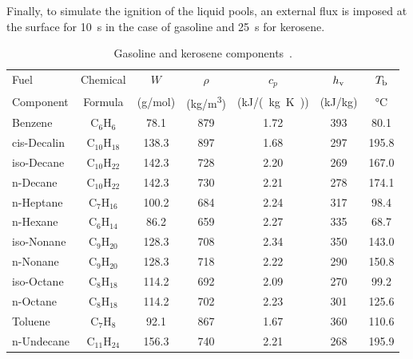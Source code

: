 Finally, to simulate the ignition of the liquid pools, an external flux is imposed at the surface for 10~s in the case of gasoline and 25~s for kerosene.

\begin{table}[h!]
\centering
\caption[Gasoline and kerosene components]{Gasoline and kerosene components~\cite{CRCHandbook:Enthalpy_of_Vaporization}.}
\label{fuelprops2}
\begin{tabular}{|l|c|c|c|c|c|c|} \hline
Fuel        & Chemical          & $W$         & $\rho$      & $c_p$              & $h_{\rm v}$        & $T_{\rm b}$     \\
Component   & Formula           & (g/mol)     & (\unit{kg/m^3})  & (\unit{kJ/(kg.K)})  & (kJ/kg)            & \unit{\degreeCelsius}       \\
\hline \hline
Benzene     & C$_6$H$_{6}$      & 78.1        & 879         & 1.72              & 393                 & 80.1   \\ \hline
cis-Decalin & C$_{10}$H$_{18}$  & 138.3       & 897         & 1.68              & 297                 & 195.8  \\ \hline
iso-Decane  & C$_{10}$H$_{22}$  & 142.3       & 728         & 2.20              & 269                 & 167.0  \\ \hline
n-Decane    & C$_{10}$H$_{22}$  & 142.3       & 730         & 2.21              & 278                 & 174.1  \\ \hline
n-Heptane   & C$_7$H$_{16}$     & 100.2       & 684         & 2.24              & 317                 & 98.4   \\ \hline
n-Hexane    & C$_6$H$_{14}$     & 86.2        & 659         & 2.27              & 335                 & 68.7   \\ \hline
iso-Nonane  & C$_9$H$_{20}$     & 128.3       & 708         & 2.34              & 350                 & 143.0  \\ \hline
n-Nonane    & C$_9$H$_{20}$     & 128.3       & 718         & 2.22              & 290                 & 150.8  \\ \hline
iso-Octane  & C$_8$H$_{18}$     & 114.2       & 692         & 2.09              & 270                 & 99.2   \\ \hline
n-Octane    & C$_8$H$_{18}$     & 114.2       & 702         & 2.23              & 301                 & 125.6  \\ \hline
Toluene     & C$_7$H$_{8}$      & 92.1        & 867         & 1.67              & 360                 & 110.6  \\ \hline
n-Undecane  & C$_{11}$H$_{24}$  & 156.3       & 740         & 2.21              & 268                 & 195.9  \\ \hline
\end{tabular}
\end{table}


